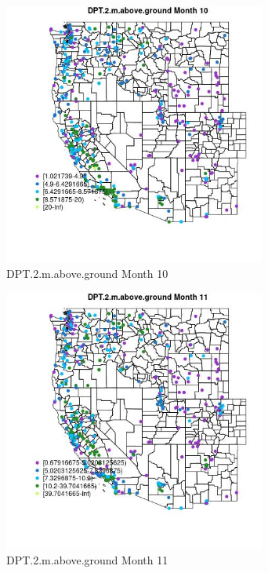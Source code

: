 \begin{figure} 
\centering  
\includegraphics[width=0.77\textwidth]{Code_Outputs/ML_input_report_ML_input_PM25_Step5_part_d_de_duplicated_aves_ML_input_MapObsMo10DPT2maboveground.jpg} 
\caption{\label{fig:ML_input_report_ML_input_PM25_Step5_part_d_de_duplicated_aves_ML_inputMapObsMo10DPT2maboveground}DPT.2.m.above.ground Month 10} 
\end{figure} 
 

\begin{figure} 
\centering  
\includegraphics[width=0.77\textwidth]{Code_Outputs/ML_input_report_ML_input_PM25_Step5_part_d_de_duplicated_aves_ML_input_MapObsMo11DPT2maboveground.jpg} 
\caption{\label{fig:ML_input_report_ML_input_PM25_Step5_part_d_de_duplicated_aves_ML_inputMapObsMo11DPT2maboveground}DPT.2.m.above.ground Month 11} 
\end{figure} 
 

